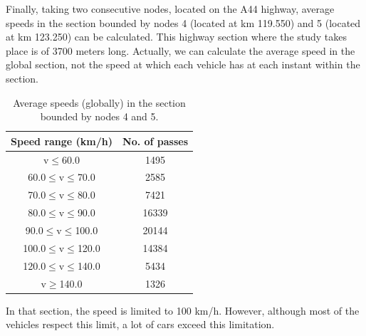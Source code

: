 \documentclass{llncs}
\begin{document}

Finally, taking two consecutive nodes, located on the A44 highway, average speeds in the section bounded by nodes 4 (located at km 119.550) and 5 (located at km 123.250) can be calculated.
This highway section where the study takes place is of 3700 meters long.
Actually, we can calculate the average speed in the global section, not the speed at which each vehicle has at each instant within the section.

 \begin{table}
 \begin{center}
 \begin{tabular}{|c|c|}
 \hline
Speed range (km/h) &  No. of passes  \\
 \hline
v$\leq$60.0	& 1495  \\
 \hline
60.0$\leq$v$\leq$70.0 & 2585  \\
 \hline
70.0$\leq$v$\leq$80.0 & 7421  \\
 \hline
80.0$\leq$v$\leq$90.0 & 16339  \\
 \hline
90.0$\leq$v$\leq$100.0 & 20144  \\
 \hline
100.0$\leq$v$\leq$120.0 & 14384  \\
 \hline
120.0$\leq$v$\leq$140.0 & 5434  \\
 \hline
v$\geq$140.0 & 1326  \\
 \hline
 \end{tabular}
 \end{center}
 \caption{Average speeds (globally) in the section bounded by nodes 4 and 5.
 \label{velocidad}}
 \end{table}


In that section, the speed is limited to 100 km/h. However, although most of the vehicles respect this limit, a lot of cars exceed this limitation.


\end{document}
